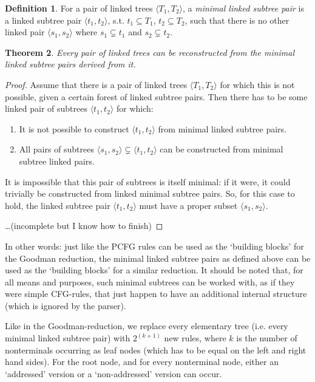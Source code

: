 \documentclass[a4paper]{article}
\newtheorem{theorem}{Theorem}[section]
\theoremstyle{definition}
\newtheorem{definition}[theorem]{Definition}
\begin{document}
\begin{definition}
For a pair of linked trees $\langle T_1, T_2 \rangle$, a \emph{minimal linked subtree pair} is a linked subtree pair $\langle t_1, t_2 \rangle$, s.t. $t_1 \subseteq T_1$, $t_2 \subseteq T_2$, such that there is no other linked pair $\langle s_1, s_2 \rangle$ where $s_1 \subsetneq t_1$ and $s_2 \subsetneq t_2$.
\end{definition}

\begin{theorem}
Every pair of linked trees can be reconstructed from the minimal linked subtree pairs derived from it.
\end{theorem}

\begin{proof}
Assume that there is a pair of linked trees $\langle T_1, T_2 \rangle$ for which this is not possible, given a certain forest of linked subtree pairs. Then there has to be some linked pair of subtrees $\langle t_1, t_2 \rangle$ for which:
\begin{enumerate}
\item It is not possible to construct $\langle t_1, t_2 \rangle$ from minimal linked subtree pairs.
\item All pairs of subtrees $\langle s_1, s_2 \rangle \subsetneq \langle t_1, t_2 \rangle$ can be constructed from minimal subtree linked pairs.
\end{enumerate}
It is impossible that this pair of subtrees is itself minimal: if it were, it could trivially be constructed from linked minimal subtree pairs. So, for this case to hold, the linked subtree pair $\langle t_1, t_2 \rangle$ must have a proper subset $\langle s_1, s_2 \rangle$.

\ldots (incomplete but I know how to finish)
\end{proof}

In other words: just like the PCFG rules can be used as the `building blocks' for the Goodman reduction, the minimal linked subtree pairs as defined above can be used as the `building blocks' for a similar reduction. It should be noted that, for all means and purposes, such minimal subtrees can be worked with, as if they were simple CFG-rules, that just happen to have an additional internal structure (which is ignored by the parser).

Like in the Goodman-reduction, we replace every elementary tree (i.e. every minimal linked subtree pair) with $2^{(k+1)}$ new rules, where $k$ is the number of nonterminals occurring as leaf nodes (which has to be equal on the left and right hand sides). For the root node, and for every nonterminal node, either an `addressed' version or a `non-addressed' version can occur.
\end{document}
